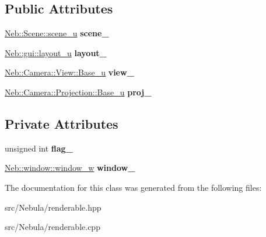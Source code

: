 \subsection*{\-Public \-Attributes}
\begin{DoxyCompactItemize}
\item 
\hypertarget{classglutpp_1_1renderable_afdb475f2230f0cb44c13f7b4e31c2bc9}{\hyperlink{classNeb_1_1unique__ptr}{\-Neb\-::\-Scene\-::scene\-\_\-u} {\bfseries scene\-\_\-}}\label{classglutpp_1_1renderable_afdb475f2230f0cb44c13f7b4e31c2bc9}

\item 
\hypertarget{classglutpp_1_1renderable_a77a5d1583d177b61df1bb55ec137844c}{\hyperlink{classNeb_1_1unique__ptr}{\-Neb\-::gui\-::layout\-\_\-u} {\bfseries layout\-\_\-}}\label{classglutpp_1_1renderable_a77a5d1583d177b61df1bb55ec137844c}

\item 
\hypertarget{classglutpp_1_1renderable_a20e64e4572b662b1493b854cd2461a22}{\hyperlink{classNeb_1_1unique__ptr}{\-Neb\-::\-Camera\-::\-View\-::\-Base\-\_\-u} {\bfseries view\-\_\-}}\label{classglutpp_1_1renderable_a20e64e4572b662b1493b854cd2461a22}

\item 
\hypertarget{classglutpp_1_1renderable_af2776c8f4b46e9e7c027dec98f5d42a0}{\hyperlink{classNeb_1_1unique__ptr}{\-Neb\-::\-Camera\-::\-Projection\-::\-Base\-\_\-u} {\bfseries proj\-\_\-}}\label{classglutpp_1_1renderable_af2776c8f4b46e9e7c027dec98f5d42a0}

\end{DoxyCompactItemize}
\subsection*{\-Private \-Attributes}
\begin{DoxyCompactItemize}
\item 
\hypertarget{classglutpp_1_1renderable_a788aa725277a26a52b34b0be8aeeab1e}{unsigned int {\bfseries flag\-\_\-}}\label{classglutpp_1_1renderable_a788aa725277a26a52b34b0be8aeeab1e}

\item 
\hypertarget{classglutpp_1_1renderable_a169f85d22a1244b4667bd7f41a015f3f}{\hyperlink{classNeb_1_1weak__ptr}{\-Neb\-::window\-::window\-\_\-w} {\bfseries window\-\_\-}}\label{classglutpp_1_1renderable_a169f85d22a1244b4667bd7f41a015f3f}

\end{DoxyCompactItemize}


\-The documentation for this class was generated from the following files\-:\begin{DoxyCompactItemize}
\item 
src/\-Nebula/renderable.\-hpp\item 
src/\-Nebula/renderable.\-cpp\end{DoxyCompactItemize}
